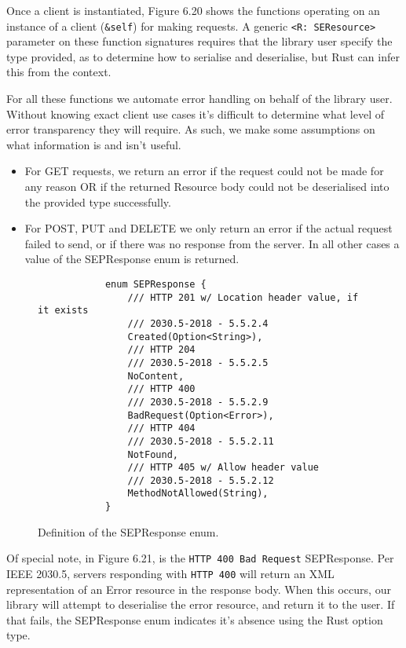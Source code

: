 Once a client is instantiated, Figure 6.20 shows the functions operating on an instance of a client (\texttt{\&self}) for making requests. A generic \texttt{<R: SEResource>} parameter on these function signatures requires that the library user specify the type provided, as to determine how to serialise and deserialise, but Rust can infer this from the context. 

For all these functions we automate error handling on behalf of the library user. Without knowing exact client use cases it's difficult to determine what level of error transparency they will require. As such, we make some assumptions on what information is and isn't useful.

\begin{itemize}
    \item For GET requests, we return an error if the request could not be made for any reason OR if the returned Resource body could not be deserialised into the provided type successfully.
    \item For POST, PUT and DELETE we only return an error if the actual request failed to send, or if there was no response from the server. In all other cases a value of the SEPResponse enum is returned.
\end{itemize}

\begin{figure}[h]
    \begin{center}
        \begin{lstlisting}
            enum SEPResponse {
                /// HTTP 201 w/ Location header value, if it exists
                /// 2030.5-2018 - 5.5.2.4
                Created(Option<String>),
                /// HTTP 204
                /// 2030.5-2018 - 5.5.2.5
                NoContent,
                /// HTTP 400 
                /// 2030.5-2018 - 5.5.2.9
                BadRequest(Option<Error>),
                /// HTTP 404 
                /// 2030.5-2018 - 5.5.2.11
                NotFound,
                /// HTTP 405 w/ Allow header value 
                /// 2030.5-2018 - 5.5.2.12
                MethodNotAllowed(String),
            }
        \end{lstlisting}
        \label{fig:sepresponse}
        \vspace{-10pt}
        \caption{Definition of the SEPResponse enum.}
    \end{center}
\end{figure}

Of special note, in Figure 6.21, is the \texttt{HTTP 400 Bad Request} SEPResponse. Per IEEE 2030.5, servers responding with \texttt{HTTP 400} will return an XML representation of an Error resource in the response body. When this occurs, our library will attempt to deserialise the error resource, and return it to the user. If that fails, the SEPResponse enum indicates it's absence using the Rust option type.

